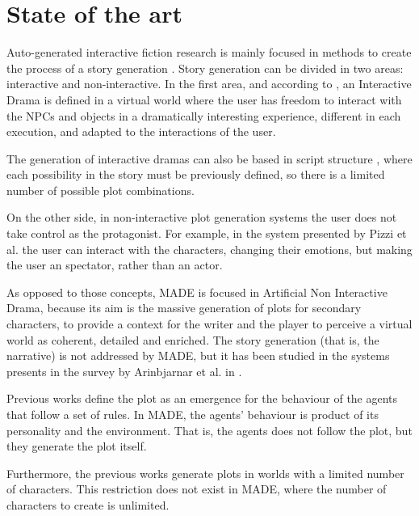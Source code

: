 \documentclass[runningheads]{llncs}
\begin{document}
\section{State of the art}
\label{sec:soa}


Auto-generated interactive fiction research is mainly focused in methods to create the process of a story generation \cite{nairat2011character}. Story generation can be divided in two areas: interactive and non-interactive. In the first area, and according to \cite{ReviewArinbjarnar09}, an Interactive Drama is defined in a virtual world where the user has freedom to interact with the NPCs and objects in a dramatically interesting experience, different in each execution, and adapted to the interactions of the user.

The generation of interactive dramas can also be based in script
structure \cite{ArchitectureYoung04}, where each possibility in the
story must be previously defined, so there is a limited number of
possible plot combinations.

On the other side, in non-interactive plot generation systems the user does not take control as the protagonist. For example, in the system presented by Pizzi et al. \cite{pizzi2007interactive} the user can interact with the characters, changing their emotions, but making the user an spectator, rather than an actor.

As opposed to those concepts, MADE is focused in Artificial Non Interactive Drama, because its aim is the massive generation of plots for secondary characters, to provide a context for the writer and the player to perceive a virtual world as coherent, detailed and enriched. The story generation (that is, the narrative) is not addressed by MADE, but it has been studied in the systems presents in the survey by Arinbjarnar et al. in \cite{ReviewArinbjarnar09}.


Previous works define the plot as an emergence for the behaviour of the agents that follow a set of rules. In MADE, the agents' behaviour is product of its personality and the environment. That is, the agents does not follow the plot, but they generate the plot itself. 


Furthermore, the previous works generate plots in worlds with a limited number of characters. This restriction does not exist in MADE, where the number of characters to create is unlimited.
\end{document}
